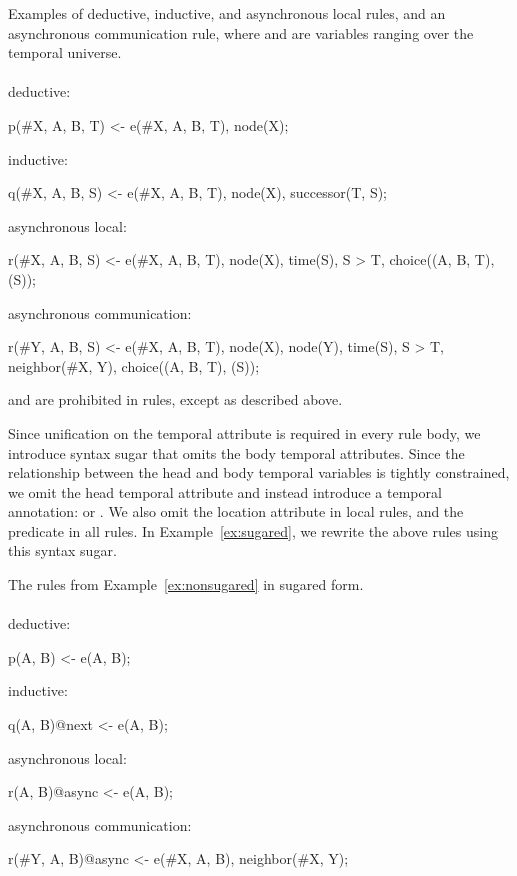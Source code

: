 \begin{example}
\label{ex:nonsugared}
Examples of deductive, inductive, and asynchronous local rules, and an asynchronous communication rule, where  and  are variables ranging over the temporal universe.
\\\\
deductive:\\
\begin{Dedalus}
p(#X, A, B, T) <- e(#X, A, B, T), node(X);
\end{Dedalus}
inductive:\\
\begin{Dedalus}
q(#X, A, B, S) <- e(#X, A, B, T), node(X),
                  successor(T, S);
\end{Dedalus}
asynchronous local:\\
\begin{Dedalus}
r(#X, A, B, S) <- e(#X, A, B, T), node(X), time(S),
                  S > T, choice((A, B, T), (S));
\end{Dedalus}
asynchronous communication:\\
\begin{Dedalus}
r(#Y, A, B, S) <- e(#X, A, B, T), node(X), node(Y),
                  time(S), S > T, neighbor(#X, Y),
                  choice((A, B, T), (S));
\end{Dedalus}
\end{example}

 and  are prohibited in rules, except as described above.

Since unification on the temporal attribute is required in every rule body,
we introduce syntax sugar that omits the body temporal attributes.  Since the relationship between the head and body temporal variables is tightly constrained, we omit the head temporal attribute and instead introduce a temporal annotation:  or .  We also omit the location attribute in local rules, and the  predicate in all rules.  In Example~\ref{ex:sugared}, we rewrite the above rules using this syntax sugar.

\begin{example}
\label{ex:sugared}
The rules from Example~\ref{ex:nonsugared} in sugared form.
\\\\
deductive:\\
\begin{Dedalus}
p(A, B) <- e(A, B);
\end{Dedalus}
inductive:\\
\begin{Dedalus}
q(A, B)@next <- e(A, B);
\end{Dedalus}
asynchronous local:\\
\begin{Dedalus}
r(A, B)@async <- e(A, B);
\end{Dedalus}
asynchronous communication:\\
\begin{Dedalus}
r(#Y, A, B)@async <- e(#X, A, B), neighbor(#X, Y);
\end{Dedalus}
\end{example}


